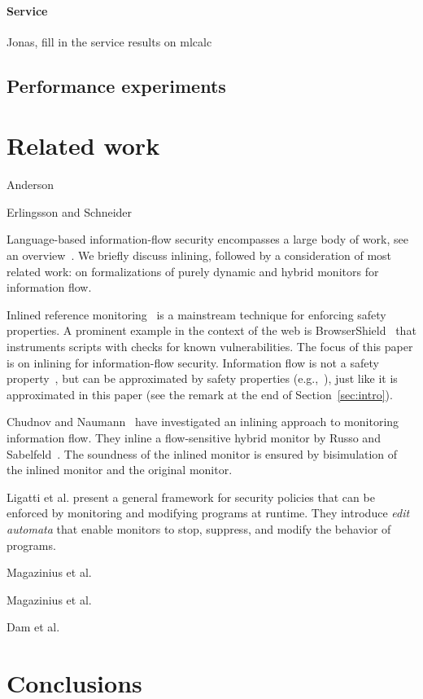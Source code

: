\documentclass{llncs}
\begin{document}
\paragraph{Service}

Jonas, fill in the service results on mlcalc


\subsection{Performance experiments}

\section{Related work}
\label{sec:related}

Anderson~\cite{Anderson:72}

Erlingsson and Schneider~\cite{DBLP:conf/nspw/ErlingssonS99}

Language-based information-flow security encompasses a large body of
work, see an overview~\cite{Sabelfeld:Myers:JSAC}. We briefly
discuss inlining, followed by a consideration of most related work: on
formalizations of purely dynamic and hybrid monitors for information flow.

Inlined reference monitoring~\cite{Erlingsson:PhD04} is a mainstream
technique for enforcing safety properties. 
A prominent example in the context of the web is
BrowserShield~\cite{Reis+:TWeb07} that instruments scripts with
checks for known vulnerabilities.
The focus of this paper is on inlining for information-flow security. Information flow is not
a safety property~\cite{McLean:SSP94}, but can be approximated by
safety properties
(e.g.,~\cite{Boudol:FAST08,Sabelfeld:Russo:PSI09,Austin:Flanagan:PLAS09}),
just like it is approximated in this paper (see the remark at the end of Section~\ref{sec:intro}).

Chudnov and
Naumann~\cite{Chudnov:Naumann:CSF10} have investigated an inlining
approach to monitoring information flow. They inline a flow-sensitive
hybrid monitor by Russo and
Sabelfeld~\cite{Russo:Sabelfeld:CSF10}. The soundness of the inlined
monitor is ensured by bisimulation of the inlined monitor and the
original monitor.

Ligatti et al. \cite{Ligatti05editautomata:} present a 
general framework for security policies that can
be enforced by monitoring and modifying programs at runtime. 
They introduce \emph{edit automata} that enable
monitors to stop, suppress, and modify the behavior of programs. 

Magazinius et al.~\cite{DBLP:conf/nordsec/MagaziniusPS10}

Magazinius et al.~\cite{DBLP:journals/compsec/MagaziniusRS12}

Dam et al.~\cite{DBLP:conf/ecoop/DamJLP09,DBLP:journals/jcs/DamJLP10,DBLP:conf/ccs/DamGL12}

\section{Conclusions}
\label{sec:conc}



\end{document}
